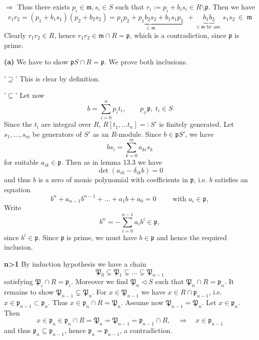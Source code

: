 \documentclass[12pt]{book}
\begin{document}
\begin{spacing}{1.3}
\begin{compactitem}
\begin{compactenum}
$\Longrightarrow$ Thus there exists $p_i \in \mathfrak{m}, s_i \in S$ such that $r_i:=p_i+b_is_i \in R\setminus \mathfrak{p}$.  Then we have
$$r_1r_2=(p_1+b_1s_1)(p_2+b_2s_2)=\underbrace{p_1p_2+p_1b_2s_2+b_1s_1p_2}_{\in \mathfrak{m}}\ \ +\underbrace{b_1b_2}_{\in \mathfrak{m} \textrm{ by ass. }}s_1s_2\ \in \ \mathfrak{m}$$
Clearly $r_1r_2 \in R$, hence $r_1r_2 \in \mathfrak{m} \cap R = \mathfrak{p}$, which is a contradiction, since $\mathfrak{p}$ is prime.
\item[\textbf{(a)}] We have to show $\mathfrak{p}S \cap R = \mathfrak{p}$. We prove both inclusions.
\begin{compactitem}
\item['$\supseteq$'] This is clear by definition.
\item['$\subseteq$'] Let now
$$b=\sum_{i=0}^n p_i t_i, \qquad p_ \in \mathfrak{p}, \ t_i \in S$$
Since the $t_i$ are integral over $R$, $R[t_1, \ldots t_n]=:S'$ is finitely generated. Let $s_1, \ldots, s_m$ be generators of $S'$ as an $R$-module. Since $b \in \mathfrak{p}S'$, we have
$$bs_i=\sum_{k=0}^m a_{ki}s_k$$
for suitable $a_{ik} \in \mathfrak{p}$. Then as in lemma 13.3 we have $$\det(a_{ik}-\delta_{ik}b)=0$$ and thus $b$ is a zero of monic polynomial with coefficients in $\mathfrak{p}$, i.e. $b$ satisfies an equation 
$$b^n+a_{n-1}b^{n-1} + \ldots + a_1b+a_0=0 \qquad \textrm{ with } a_i \in \mathfrak{p},$$
Write
$$b^n=-\sum_{i=0}^{n-1} a_i b^{i} \in \mathfrak{p},$$
since $b^{i} \in \mathfrak{p}$. Since $\mathfrak{p}$ is prime, we must have $b \in \mathfrak{p}$ and hence the required inclusion.\\
\end{compactitem}
\end{compactenum}
\item[\textbf{n>1}] By induction hypothesis we have a chain
$$\mathfrak{P}_0 \subsetneq \mathfrak{P}_1 \subsetneq \ldots \subsetneq \mathfrak{P}_{n-1}$$
satisfying $\mathfrak{P}_i \cap R = \mathfrak{p}_i$. Moreover we find $\mathfrak{P}_n \triangleleft S$ such that $\mathfrak{P}_n \cap R=\mathfrak{p}_n$. It remains to show $\mathfrak{P}_{n-1} \subsetneq \mathfrak{P}_n$.
For $x \in \mathfrak{P}_{n-1}$ we have $x \in R \cap \mathfrak{p}_{n-1}$, i.e. $x \in \mathfrak{p}_{n-1}\subset \mathfrak{p}_n$. Thus $x \in \mathfrak{p}_{n} \cap R = \mathfrak{P}_n$. Assume now $\mathfrak{P}_{n-1}=\mathfrak{P}_{n}$. Let $x\in \mathfrak{p}_{n}$. Then $$x \in \mathfrak{p}_n \in \mathfrak{p}_n\cap R=\mathfrak{P}_n=\mathfrak{P}_{n-1}=\mathfrak{p}_{n-1} \cap R, \quad \Longrightarrow \quad x \in \mathfrak{p}_{n-1}$$
and thus $\mathfrak{p}_n \subseteq \mathfrak{p}_{n-1}$, hence $\mathfrak{p}_n=\mathfrak{p}_{n-1}$, a contradiction.
\end{compactitem}


\end{spacing}
\end{document}
